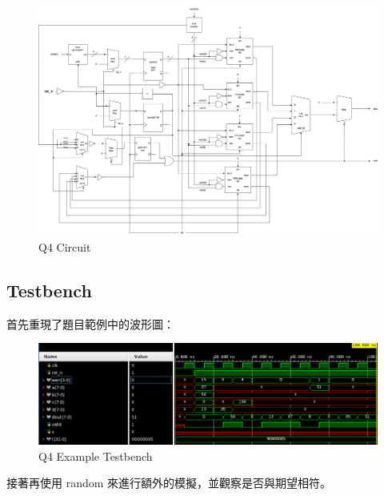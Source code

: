 \documentclass[10.5pt,compsoc,UTF8]{CjC}
\theoremstyle{mystyle}
\begin{document}
\begin{figure}[!h]
  \centering
  \includegraphics[width=\textwidth]{./img/Q4.png}
  \caption{Q4 Circuit}
  \label{fig:Q4}
\end{figure}

\newpage

\subsection{Testbench}

首先重現了題目範例中的波形圖：

\begin{figure}[!h]
  \centering
  \includegraphics[width=\textwidth]{./img/Q4-tb-ex.png}
  \caption{Q4 Example Testbench}
  \label{fig:Q4-tb-ex}
\end{figure}

接著再使用 random 來進行額外的模擬，並觀察是否與期望相符。
\end{document}
